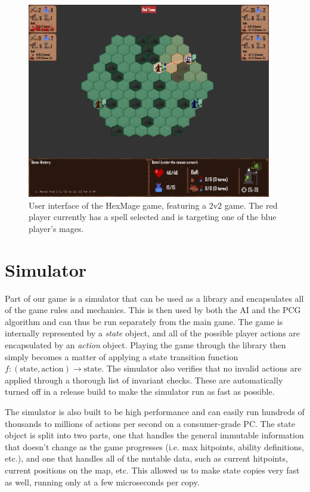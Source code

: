 \begin{figure}[h]
	\centering
	\includegraphics[width=0.95\textwidth]{img/arena.png}
	\caption{User interface of the HexMage game, featuring a 2v2 game. The red player currently has a spell selected and is targeting one of the blue player's mages.}	
	\label{fig:arena}
\end{figure}


\section{Simulator}

Part of our game is a simulator that can be used as a library and encapsulates
all of the game rules and mechanics. This is then used by both the AI and the
PCG algorithm and can thus be run separately from the main game. The game is
internally represented by a \emph{state} object, and all of the possible player
actions are encapsulated by an \emph{action} object.  Playing the game through
the library then simply becomes a matter of applying a state transition
function $f: (\text{state}, \text{action}) \rightarrow \text{state}$. The
simulator also verifies that no invalid actions are applied through a thorough
list of invariant checks. These are automatically turned off in a release build
to make the simulator run as fast as possible.

The simulator is also built to be high performance and can easily run hundreds
of thousands to millions of actions per second on a consumer-grade PC. 
The state object is split into two parts, one that handles the
general immutable information that doesn't change as the game progresses (i.e.
max hitpoints, ability definitions, etc.), and one that handles all of the
mutable data, such as current hitpoints, current positions on the map, etc.
This allowed us to make state copies very fast as well, running only at a few
microseconds per copy.

